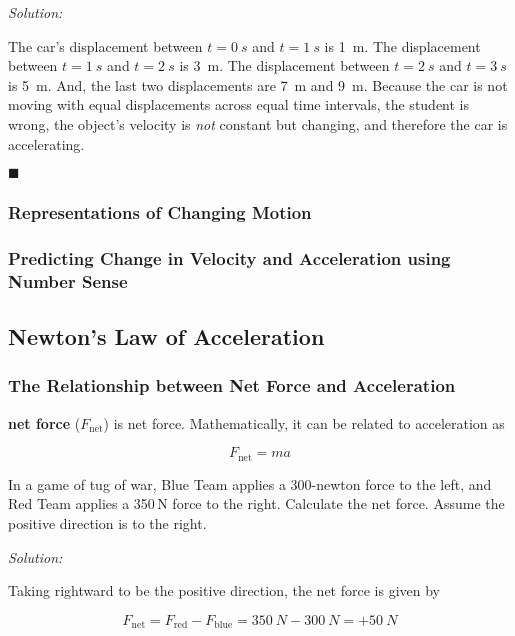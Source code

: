 \documentclass[dvipsnames]{article}
\begin{document}
\textit{Solution:}

The car's displacement between $t = \SI{0}{s}$ and $t = \SI{1}{s}$ is \SI{1}{m}. The displacement between $t = \SI{1}{s}$ and $t = \SI{2}{s}$ is \SI{3}{m}. The displacement between $t = \SI{2}{s}$ and $t = \SI{3}{s}$ is \SI{5}{m}. And, the last two displacements are \SI{7}{m} and \SI{9}{m}. Because the car is not moving with equal displacements across equal time intervals, the student is wrong, the object's velocity is \textit{not} constant but changing, and therefore the car is accelerating.

\hfill $\blacksquare$

\subsubsection{Representations of Changing Motion}

\subsubsection{Predicting Change in Velocity and Acceleration using Number Sense}

\subsection{Newton's Law of Acceleration}

\subsubsection{The Relationship between Net Force and Acceleration}

\textbf{\Gls{net force}} ($F_\text{net}$) is \glsdesc{net force}. Mathematically, it can be related to acceleration as

\begin{equation*}
    F_\text{net} = ma
\end{equation*}


\begin{example}
In a game of tug of war, Blue Team applies a 300-newton force to the left, and Red Team applies a 350\,N force to the right. Calculate the net force. Assume the positive direction is to the right.
\end{example}

\textit{Solution:} 

Taking rightward to be the positive direction, the net force is given by

\begin{equation*}
    F_\mathrm{net} = F_\mathrm{red} - F_\mathrm{blue} = \SI{350}{N} - \SI{300}{N} = \boxed{+\SI{50}{N}}
\end{equation*}
\end{document}
